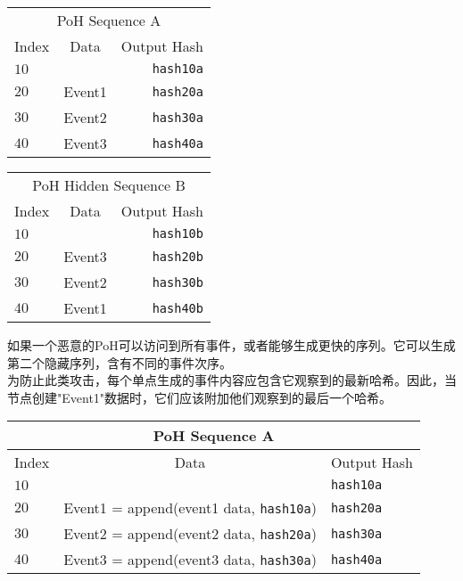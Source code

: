 \documentclass[12pt, uft8]{ctexart}
\begin{document}
\begin{center}
  \begin{tabular}{ | l c r |}
    \hline
    \multicolumn{3}{|c|}{PoH Sequence A} \\
    Index & Data & Output Hash  \\ \hline
    $10$ & & \texttt{hash10a} \\
    $20$ & Event1 & \texttt{hash20a} \\
    $30$ & Event2 & \texttt{hash30a} \\
    $40$ & Event3 & \texttt{hash40a} \\
    \hline
    \end{tabular}
  \begin{tabular}{ | l c r |}
    \hline
    \multicolumn{3}{|c|}{PoH Hidden Sequence B} \\
    Index & Data & Output Hash \\ \hline
    $10$ & & \texttt{hash10b}\\
    $20$ & Event3 & \texttt{hash20b}  \\
    $30$ & Event2 & \texttt{hash30b} \\
    $40$ & Event1 & \texttt{hash40b} \\
    \hline
    \end{tabular}
\end{center}

如果一个恶意的PoH可以访问到所有事件，或者能够生成更快的序列。它可以生成第二个隐藏序列，含有不同的事件次序。\\

为防止此类攻击，每个单点生成的事件内容应包含它观察到的最新哈希。因此，当节点创建"Event1"数据时，它们应该附加他们观察到的最后一个哈希。    \\

\begin{center}
  \begin{tabular}{  l  c l}

    \multicolumn{3}{c}{PoH Sequence A} \\
    \hline
    Index  & Data & Output Hash  \\ \hline
    $10$ & & \texttt{hash10a} \\
    $20$ & Event1 = append(event1 data, \texttt{hash10a}) & \texttt{hash20a}  \\
    $30$ & Event2 = append(event2 data, \texttt{hash20a}) & \texttt{hash30a} \\
    $40$ &  Event3 = append(event3 data, \texttt{hash30a}) & \texttt{hash40a} \\
    \end{tabular}
\end{center}
\end{document}
